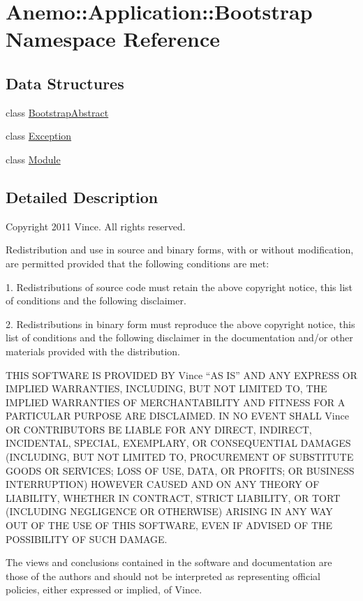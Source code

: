 \hypertarget{namespace_anemo_1_1_application_1_1_bootstrap}{
\section{Anemo::Application::Bootstrap Namespace Reference}
\label{namespace_anemo_1_1_application_1_1_bootstrap}
}
\subsection*{Data Structures}
\begin{DoxyCompactItemize}
\item 
class \hyperlink{class_anemo_1_1_application_1_1_bootstrap_1_1_bootstrap_abstract}{BootstrapAbstract}
\item 
class \hyperlink{class_anemo_1_1_application_1_1_bootstrap_1_1_exception}{Exception}
\item 
class \hyperlink{class_anemo_1_1_application_1_1_bootstrap_1_1_module}{Module}
\end{DoxyCompactItemize}


\subsection{Detailed Description}
Copyright 2011 Vince. All rights reserved.

Redistribution and use in source and binary forms, with or without modification, are permitted provided that the following conditions are met:

1. Redistributions of source code must retain the above copyright notice, this list of conditions and the following disclaimer.

2. Redistributions in binary form must reproduce the above copyright notice, this list of conditions and the following disclaimer in the documentation and/or other materials provided with the distribution.

THIS SOFTWARE IS PROVIDED BY Vince ``AS IS'' AND ANY EXPRESS OR IMPLIED WARRANTIES, INCLUDING, BUT NOT LIMITED TO, THE IMPLIED WARRANTIES OF MERCHANTABILITY AND FITNESS FOR A PARTICULAR PURPOSE ARE DISCLAIMED. IN NO EVENT SHALL Vince OR CONTRIBUTORS BE LIABLE FOR ANY DIRECT, INDIRECT, INCIDENTAL, SPECIAL, EXEMPLARY, OR CONSEQUENTIAL DAMAGES (INCLUDING, BUT NOT LIMITED TO, PROCUREMENT OF SUBSTITUTE GOODS OR SERVICES; LOSS OF USE, DATA, OR PROFITS; OR BUSINESS INTERRUPTION) HOWEVER CAUSED AND ON ANY THEORY OF LIABILITY, WHETHER IN CONTRACT, STRICT LIABILITY, OR TORT (INCLUDING NEGLIGENCE OR OTHERWISE) ARISING IN ANY WAY OUT OF THE USE OF THIS SOFTWARE, EVEN IF ADVISED OF THE POSSIBILITY OF SUCH DAMAGE.

The views and conclusions contained in the software and documentation are those of the authors and should not be interpreted as representing official policies, either expressed or implied, of Vince. 
